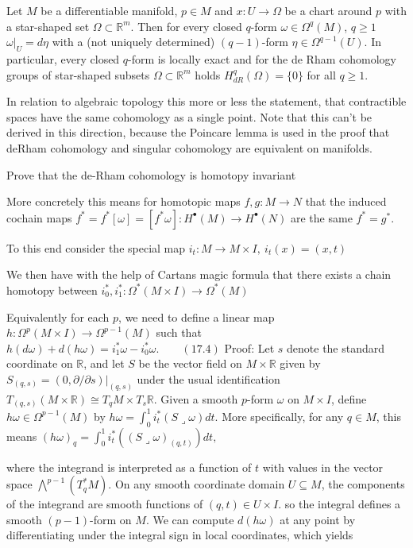 Let \(M\) be a differentiable manifold, \(p \in M\) and \(x: U \to \Omega\) be a chart around \(p\) 
with a star-shaped set \(\Omega \subset \mathbb{R}^m\). 
Then for every closed \(q\)-form \(\omega \in \Omega^q(M)\), \(q \geq 1\)
\(\omega|_U = d\eta\)
with a (not uniquely determined) \((q-1)\)-form \(\eta \in \Omega^{q-1}(U)\). 
In particular, every closed \(q\)-form is locally exact and for the de Rham cohomology groups 
of star-shaped subsets \(\Omega \subset \mathbb{R}^m\) holds \(H^q_{dR}(\Omega) = \{0\}\) for all \(q \geq 1\).

In relation to algebraic topology this more or less the statement, that contractible spaces have the same cohomology
as a single point. Note that this can't be derived in this direction, because the Poincare lemma is used in the proof
that deRham cohomology and singular cohomology are equivalent on manifolds.


Prove that the de-Rham cohomology is homotopy invariant

More concretely this means for homotopic maps \( f,g : M \to N \) that the induced cochain maps 
\( f^\ast = f^\ast[\omega] = [f^\ast \omega] : H^\bullet(M) \to H^\bullet(N)\) are the same \( f^\ast = g^\ast \).

To this end consider the special map \( i_t : M \to M \times I,\ i_t(x) = (x, t) \)

We then have with the help of Cartans magic formula
that there exists a chain homotopy between \( i_0^\ast, i_1^\ast : \Omega^\ast(M \times I) \to \Omega^\ast(M)\)

Equivalently for each \(p\), we need to define a linear map \(h:\Omega^{p}(M\times I)\rightarrow\Omega^{p-1}(M)\)
such that
\(h(d\omega) + d(h\omega) = i_1^*\omega - i_0^*\omega. \qquad (17.4)\)
Proof:
Let \(s\) denote the standard coordinate on \(\mathbb{R}\), and let \(S\) be the vector field on \(M \times \mathbb{R}\)
given by \(S_{(q,s)} = (0, \partial / \partial s)|_{(q,s)}\) under the usual identification \(T_{(q,s)}(M \times \mathbb{R}) \cong T_qM \times T_s \mathbb{R}\). 
Given a smooth \(p\)-form \(\omega\) on \(M \times I\), define \(h\omega \in \Omega^{p-1}(M)\) by
\(h\omega=\int_{0}^{1}i_{t}^{*}(S \lrcorner \omega)dt.\)
More specifically, for any \(q \in M\), this means
\((h\omega)_{q}=\int_{0}^{1}i_{t}^{*}((S \lrcorner \omega)_{(q,t)})dt,\)

where the integrand is interpreted as a function of \(t\) with values in the vector space
\(\bigwedge^{p-1}(T^*_q M)\). On any smooth coordinate domain \(U \subseteq M\), the components of the
integrand are smooth functions of \((q,t) \in U \times I\). so the integral defines a smooth
\((p-1)\)-form on \(M\). We can compute \(d(h\omega)\) at any point by differentiating under
the integral sign in local coordinates, which yields


